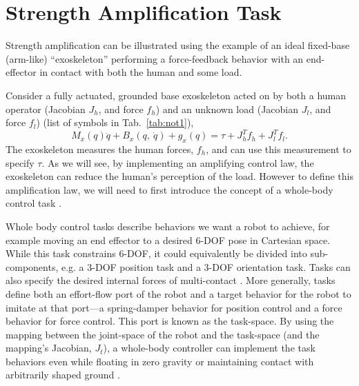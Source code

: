 \documentclass[utf8]{frontiersSCNS}
\renewcommand*{\cite}[1]{\citep{#1}}
\begin{document}

\section{Strength Amplification Task}\label{sec:theory}
Strength amplification can be illustrated using the example of an ideal fixed-base (arm-like) ``exoskeleton'' performing a force-feedback behavior with an end-effector in contact with both the human and some load.



Consider a fully actuated, grounded base exoskeleton acted on by both a human operator (Jacobian $J_h$, and force $f_h$) and an unknown load (Jacobian $J_l$, and force $f_l$) (list of symbols in Tab.~\ref{tab:not1}),
\begin{equation}
M_x(q) \ddot q + B_x(q,\ \dot q) + g_x(q) = \tau + J_h^T f_h + J_l^T f_l.\label{eq:exo_equation}
\end{equation}
The exoskeleton measures the human forces, $f_h$, and can use this measurement to specify $\tau$. 
As we will see, by implementing an amplifying control law, the exoskeleton can reduce the human's perception of the load. 
However to define this amplification law, we will need to first introduce the concept of a whole-body control task \cite{SentisParkKhatib2010TRO}.

Whole body control tasks describe behaviors we want a robot to achieve, for example moving an end effector to a desired 6-DOF pose in Cartesian space. While this task constrains 6-DOF, it could equivalently be divided into sub-components, e.g. a 3-DOF position task and a 3-DOF orientation task.
Tasks can also specify the desired internal forces of multi-contact \cite{KimEA2016TRO}.
More generally, tasks define both an effort-flow port of the robot and a target behavior for the robot to imitate at that port---a spring-damper behavior for position control and a force behavior for force control. This port is known as the task-space. By using the mapping between the joint-space of the robot and the task-space (and the mapping's Jacobian, $J_t$), a whole-body controller can implement the task behaviors even while floating in zero gravity or maintaining contact with arbitrarily shaped ground \cite{SentisParkKhatib2010TRO}. 
\end{document}
